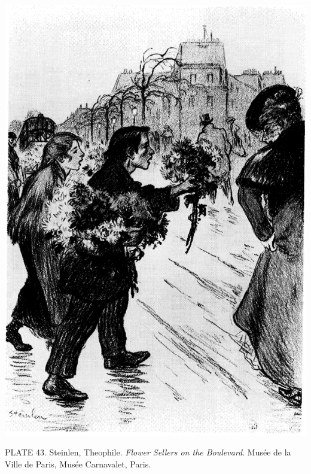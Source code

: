 \protect\hypertarget{20_ILLUSTRATIONS_FOLLOW_PAGE.xhtmlux5cux23id_38}{}{}\includegraphics{include/html/images/358_1.png}

PLATE 43. Steinlen, Theophile. \emph{Flower Sellers on the Boulevard}.
Musée de la Ville de Paris, Musée Carnavalet, Paris.


